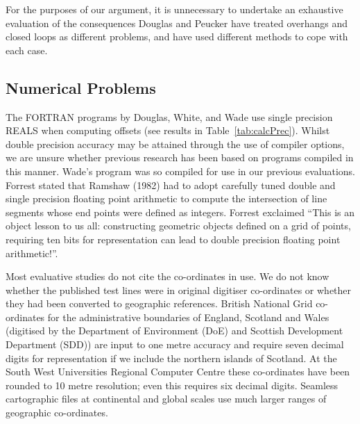 \documentclass{egpubl}
\begin{document}
For the purposes of our argument, it is unnecessary to undertake an
exhaustive evaluation of the consequences Douglas and Peucker have treated
overhangs and closed loops as different problems, and have used different
methods to cope with each case.

\subsection{Numerical Problems}

The FORTRAN programs by Douglas, White, and Wade use single precision REALS
when computing offsets (see results in Table~\ref{tab:calcPrec}). Whilst
double precision accuracy may be attained through the use of compiler
options, we are unsure whether previous research has been based on programs
compiled in this manner. Wade's program was so compiled for use in our
previous evaluations. Forrest stated that Ramshaw (1982) had to adopt
carefully tuned double and single precision floating point arithmetic to
compute the intersection of line segments whose end points were defined as
integers. Forrest exclaimed ``This is an object lesson to us all:
constructing geometric objects defined on a grid of points, requiring ten
bits for representation can lead to double precision floating point
arithmetic!''.

Most evaluative studies do not cite the co-ordinates in use. We do not know
whether the published test lines were in original digitiser co-ordinates or
whether they had been converted to geographic references. British National
Grid co-ordinates for the administrative boundaries of England, Scotland and
Wales (digitised by the Department of Environment (DoE) and Scottish
Development Department (SDD)) are input to one metre accuracy and require
seven decimal digits for representation if we include the northern islands of
Scotland. At the South West Universities Regional Computer Centre these
co-ordinates have been rounded to 10 metre resolution; even this requires six
decimal digits. Seamless cartographic files at continental and global scales
use much larger ranges of geographic co-ordinates.
\end{document}
